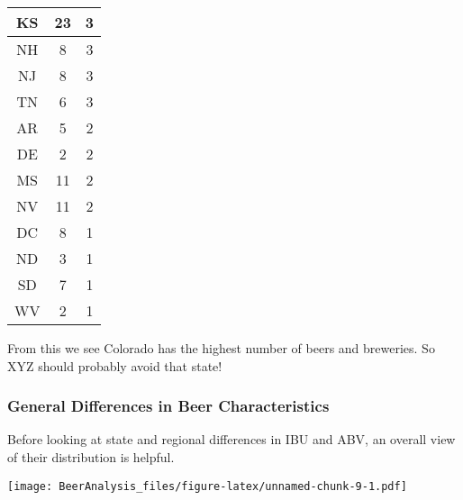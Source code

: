 \documentclass[]{article}
\newenvironment{Shaded}{\begin{snugshade}}{\end{snugshade}}
\newcommand{\DataTypeTok}[1]{\textcolor[rgb]{0.13,0.29,0.53}{#1}}
\newcommand{\DecValTok}[1]{\textcolor[rgb]{0.00,0.00,0.81}{#1}}
\newcommand{\KeywordTok}[1]{\textcolor[rgb]{0.13,0.29,0.53}{\textbf{#1}}}
\newcommand{\NormalTok}[1]{#1}
\newcommand{\OperatorTok}[1]{\textcolor[rgb]{0.81,0.36,0.00}{\textbf{#1}}}
\newcommand{\StringTok}[1]{\textcolor[rgb]{0.31,0.60,0.02}{#1}}
\begin{document}
\begin{table}[H]
\begin{tabular}{c|c|c}
\hline
KS & 23 & 3\\
\hline
NH & 8 & 3\\
\hline
NJ & 8 & 3\\
\hline
TN & 6 & 3\\
\hline
AR & 5 & 2\\
\hline
DE & 2 & 2\\
\hline
MS & 11 & 2\\
\hline
NV & 11 & 2\\
\hline
DC & 8 & 1\\
\hline
ND & 3 & 1\\
\hline
SD & 7 & 1\\
\hline
WV & 2 & 1\\
\hline
\end{tabular}
\end{table}

From this we see Colorado has the highest number of beers and breweries.
So XYZ should probably avoid that state!

\hypertarget{general-differences-in-beer-characteristics}{%
\subsubsection{General Differences in Beer
Characteristics}\label{general-differences-in-beer-characteristics}}

Before looking at state and regional differences in IBU and ABV, an
overall view of their distribution is helpful.

\begin{Shaded}
\end{Shaded}

\texttt{[image: BeerAnalysis\_files/figure-latex/unnamed-chunk-9-1.pdf]}

\begin{Shaded}
\end{Shaded}
\end{document}
